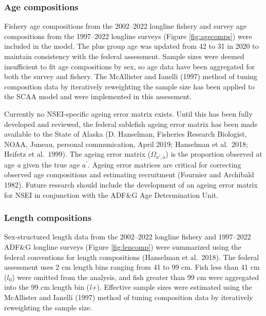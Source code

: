 \documentclass[
]{article}
\begin{document}
\hypertarget{age-compositions}{%
\subsubsection{Age compositions}\label{age-compositions}}

Fishery age compositions from the 2002--2022 longline fishery and survey age compositions from the 1997--2022 longline surveys (Figure \ref{fig:agecomps}) were included in the model. The plus group age was updated from 42 to 31 in 2020 to maintain consistency with the federal assessment. Sample sizes were deemed insufficient to fit age compositions by sex, so age data have been aggregated for both the survey and fishery. The McAllister and Ianelli (1997) method of tuning composition data by iteratively reweighting the sample size has been applied to the SCAA model and were implemented in this assessment.

Currently no NSEI-specific ageing error matrix exists. Until this has been fully developed and reviewed, the federal sablefish ageing error matrix has been made available to the State of Alaska (D. Hanselman, Fisheries Research Biologist, NOAA, Juneau, personal communication, April 2019; Hanselman et al.~2018; Heifetz et al.~1999). The ageing error matrix (\(\Omega_{a',a}\)) is the proportion observed at age \emph{a} given the true age \({a}^{'}\). Ageing error matrices are critical for correcting observed age compositions and estimating recruitment (Fournier and Archibald 1982). Future research should include the development of an ageing error matrix for NSEI in conjunction with the ADF\&G Age Determination Unit.

\hypertarget{length-compositions}{%
\subsubsection{Length compositions}\label{length-compositions}}

Sex-structured length data from the 2002--2022 longline fishery and 1997--2022 ADF\&G longline surveys (Figure \ref{fig:lencomp}) were summarized using the federal conventions for length compositions (Hanselman et al.~2018). The federal assessment uses 2 cm length bins ranging from 41 to 99 cm. Fish less than 41 cm (\emph{\(l_0\)}) were omitted from the analysis, and fish greater than 99 cm were aggregated into the 99 cm length bin (\emph{l+}). Effective sample sizes were estimated using the McAllister and Ianelli (1997) method of tuning composition data by iteratively reweighting the sample size.
\end{document}
